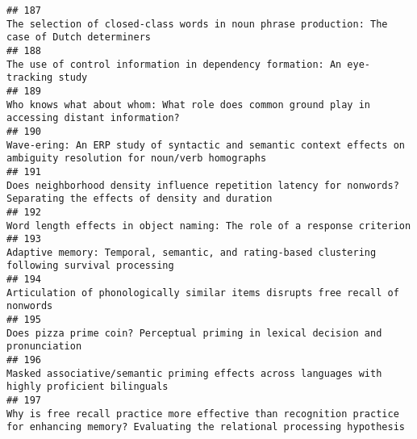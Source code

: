 \documentclass[
  english,
  man]{apa6}
\begin{document}
\begin{verbatim}
## 187                                                                                                                                             The selection of closed-class words in noun phrase production: The case of Dutch determiners
## 188                                                                                                                                                            The use of control information in dependency formation: An eye-tracking study
## 189                                                                                                                                           Who knows what about whom: What role does common ground play in accessing distant information?
## 190                                                                                                                      Wave-ering: An ERP study of syntactic and semantic context effects on ambiguity resolution for noun/verb homographs
## 191                                                                                                                      Does neighborhood density influence repetition latency for nonwords? Separating the effects of density and duration
## 192                                                                                                                                                                   Word length effects in object naming: The role of a response criterion
## 193                                                                                                                                           Adaptive memory: Temporal, semantic, and rating-based clustering following survival processing
## 194                                                                                                                                                            Articulation of phonologically similar items disrupts free recall of nonwords
## 195                                                                                                                                                          Does pizza prime coin? Perceptual priming in lexical decision and pronunciation
## 196                                                                                                                                           Masked associative/semantic priming effects across languages with highly proficient bilinguals
## 197                                                                                               Why is free recall practice more effective than recognition practice for enhancing memory? Evaluating the relational processing hypothesis

\end{verbatim}
\end{document}
